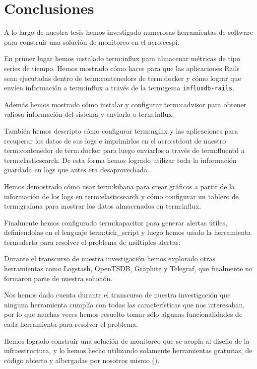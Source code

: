 \newpage
\section{Conclusiones}
\label{conclusiones}

A lo largo de nuestra tesis hemos investigado numerosas herramientas de
software para construir una solución de monitoreo en el \gls{acro:cespi}.

En primer lugar hemos instalado \gls{term:influx} para almacenar métricas de
tipo series de tiempo. Hemos mostrado cómo hacer para que las aplicaciones
Rails sean ejecutadas dentro de \glspl{term:contenedor} de \gls{term:docker} y cómo lograr
que envíen información a \gls{term:influx} a través de la \gls{term:gema}
\texttt{influxdb-rails}.

Además hemos mostrado cómo instalar y configurar \gls{term:cadvisor} para
obtener valiosa información del sistema y enviarla a \gls{term:influx}.

También hemos descripto cómo configurar \gls{term:nginx} y las aplicaciones
para recuperar los datos de sus logs e imprimirlos en el \gls{acro:stdout} de
nuestro \gls{term:contenedor} de \gls{term:docker} para luego enviarlos a través de
\gls{term:fluentd} a \gls{term:elasticsearch}. De esta forma hemos logrado
utilizar toda la información guardada en logs que antes era desaprovechada.

Hemos demostrado cómo usar \gls{term:kibana} para crear gráficos a partir de la
información de los logs en \gls{term:elasticsearch} y cómo configurar un tablero de
\gls{term:grafana} para mostrar los datos almacenados en \gls{term:influx}.

Finalmente hemos configurado \gls{term:kapacitor} para generar alertas útiles,
definiendolas en el lenguaje \gls{term:tick_script} y luego hemos usado la
herramienta \gls{term:alerta} para resolver el problema de múltiples alertas.

Durante el transcurso de nuestra investigación hemos explorado otras
herramientas como Logstash, OpenTSDB, Graphite y Telegraf, que finalmente no
formaron parte de nuestra solución.

Nos hemos dado cuenta durante el transcurso de nuestra investigación que
ninguna herramienta cumplía con todas las características que nos interesaban,
por lo que muchas veces hemos resuelto tomar sólo algunas funcionalidades de
cada herramienta para resolver el problema.

Hemos logrado construir una solución de monitoreo que se acopla al diseño de la
infraestructura, y lo hemos hecho utilizando solamente herramientas gratuitas,
de código abierto y albergadas por nosotros mismo ().

